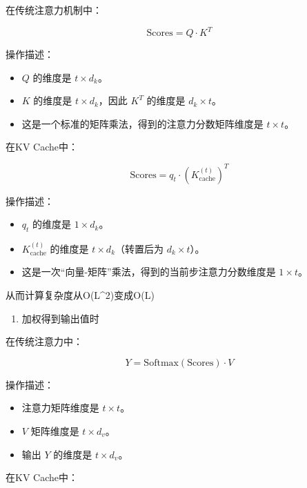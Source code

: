 在传统注意力机制中：

\[
\mathrm{Scores} = Q \cdot K^T
\]

操作描述：

\begin{itemize}
\tightlist
\item
  \(Q\) 的维度是 \(t \times d_k\)。
\item
  \(K\) 的维度是 \(t \times d_k\)，因此 \(K^T\) 的维度是 \(d_k \times t\)。
\item
  这是一个标准的矩阵乘法，得到的注意力分数矩阵维度是 \(t \times t\)。
\end{itemize}

在KV Cache中：

\[
\mathrm{Scores} = q_t \cdot (K_{\mathrm{cache}}^{(t)})^T
\]

操作描述：

\begin{itemize}
\tightlist
\item
  \(q_t\) 的维度是 \(1 \times d_k\)。
\item
  \(K_{\mathrm{cache}}^{(t)}\) 的维度是 \(t \times d_k\)（转置后为 \(d_k \times t\)）。
\item
  这是一次``向量-矩阵''乘法，得到的当前步注意力分数维度是 \(1 \times t\)。
\end{itemize}

从而计算复杂度从O(L\^{}2)变成O(L)

\begin{enumerate}
\def\labelenumi{\arabic{enumi}.}
\setcounter{enumi}{2}
\tightlist
\item
  加权得到输出值时
\end{enumerate}

在传统注意力中：

\[
Y = \mathrm{Softmax}(\mathrm{Scores}) \cdot V
\]

操作描述：

\begin{itemize}
\tightlist
\item
  注意力矩阵维度是 \(t \times t\)。
\item
  \(V\) 矩阵维度是 \(t \times d_v\)。
\item
  输出 \(Y\) 的维度是 \(t \times d_v\)。
\end{itemize}

在KV Cache中：

